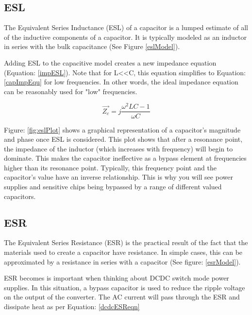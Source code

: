 \subsection{ESL}

The Equivalent Series Inductance (ESL) of a capacitor is a lumped estimate of all of the inductive components of a capacitor. It is typically modeled as an inductor in series with the bulk capacitance (See Figure \ref{eslModel}).



Adding ESL to the capacitive model creates a new impedance equation (Equation: \eqref{impESL}). Note that for L\textless \textless C, this equation simplifies to Equation: \eqref{capImpEqu} for low frequencies. In other words, the ideal impedance equation can be reasonably used for "low" frequencies.

\begin{equation}
\label{impESL}
\vec{Z_c} = j\frac{\omega ^2LC - 1}{\omega C}
\end{equation}



Figure: \ref{fig:eslPlot} shows a graphical representation of a capacitor's magnitude and phase once ESL is considered. This plot shows that after a resonance point, the impedance of the inductor (which increases with frequency) will begin to dominate. This makes the capacitor ineffective as a bypass element at frequencies higher than its resonance point. Typically, this frequency point and the capacitor's value have an inverse relationship. This is why you will see power supplies and sensitive chips being bypassed by a range of different valued capacitors. 

\subsection{ESR}

The Equivalent Series Resistance (ESR) is the practical result of the fact that the materials used to create a capacitor have resistance. In simple cases, this can be approximated by a resistance in series with a capacitor (See figure: \ref{esrModel}).

ESR becomes is important when thinking about DCDC switch mode power supplies. In this situation, a bypass capacitor is used to reduce the ripple voltage on the output of the converter. The AC current will pass through the ESR and dissipate heat as per Equation: \eqref{dcdcESReqn}


